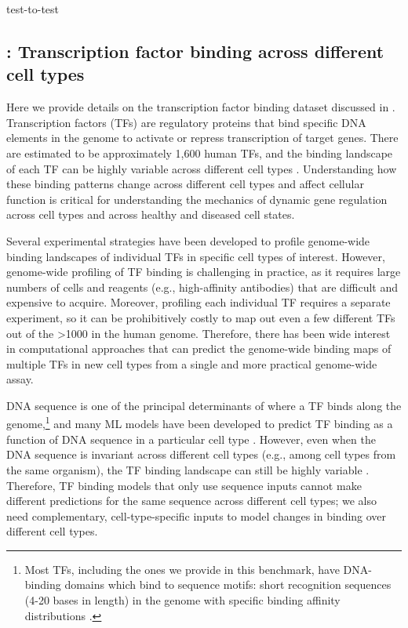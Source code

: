 test-to-test\subsection{\Encode: Transcription factor binding across different cell types}
\label{sec:app_encode}

Here we provide details on the transcription factor binding dataset discussed in .
Transcription factors (TFs) are regulatory proteins that bind specific DNA elements in the genome to activate or repress transcription of target genes.
There are estimated to be approximately 1,600 human TFs, and the binding landscape of each TF can be highly variable across different cell types \citep{deplancke16TFbindingreview}.
Understanding how these binding patterns change across different cell types and affect cellular function is critical for understanding the mechanics of dynamic gene regulation across cell types and across healthy and diseased cell states.

Several experimental strategies have been developed to profile genome-wide binding landscapes of individual TFs in specific cell types of interest.
However, genome-wide profiling of TF binding is challenging in practice, as it requires large numbers of cells and reagents (e.g., high-affinity antibodies) that are difficult and expensive to acquire.
Moreover, profiling each individual TF requires a separate experiment, so it can be prohibitively costly to map out even a few different TFs out of the \textgreater 1000 in the human genome.
Therefore, there has been wide interest in computational approaches that can predict the genome-wide binding maps of multiple TFs in new cell types from a single and more practical genome-wide assay.

DNA sequence is one of the principal determinants of where a TF binds along the genome,\footnote{Most TFs, including the ones we provide in this benchmark, have DNA-binding domains which bind to sequence motifs: short recognition sequences (4-20 bases in length) in the genome with specific binding affinity distributions \citep{StormoZ10}.}
and many ML models have been developed to predict TF binding as a function of DNA sequence in a particular cell type \citep{deepbind15, quang2019factornet, avsec2021base}.
However, even when the DNA sequence is invariant across different cell types (e.g., among cell types from the same organism), the TF binding landscape can still be highly variable \citep{deplancke16TFbindingreview}.
Therefore, TF binding models that only use sequence inputs cannot make different predictions for the same sequence across different cell types;
we also need complementary, cell-type-specific inputs to model changes in binding over different cell types.


